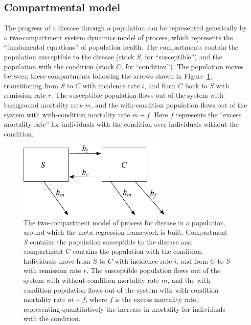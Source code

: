 \documentclass[12pt]{article}
\newcommand{\1}{\mathbf{1}}
\newcommand{\0}{\mathbf{0}}
\begin{document}
\subsection{Compartmental model}
The progress of a disease through a population can be represented
generically by a two-compartment system dynamics model of process,
which represents the ``fundamental equations'' of population
health. The compartments contain the population susceptible to the
disease (stock $S$, for ``susceptible'') and the population with the
condition (stock $C$, for ``condition''). The population moves between
these compartments following the arrows shown in
Figure~\ref{forward-sim-two-compartment}, transitioning from $S$ to
$C$ with incidence rate $i$, and from $C$ back to $S$ with remission
rate $r$. The susceptible population flows out of the system with
background mortality rate $m$, and the with-condition population flows
out of the system with with-condition mortality rate $m+f$.  Here $f$
represents the ``excess mortality rate'' for individuals with the
condition over individuals without the condition.

\begin{figure}[h]
\begin{center}
\includegraphics[width=3in]{SC.pdf}
\caption{The two-compartment model of process for disease in a
  population, around which the meta-regression framework is
  built. Compartment $S$ contains the population susceptible to the
  disease and compartment $C$ contains the population with the
  condition. Individuals move from $S$ to $C$ with incidence rate $i$,
  and from $C$ to $S$ with remission rate $r$. The susceptible
  population flows out of the system with without-condition mortality
  rate $m$, and the with-condition population flows out of the system
  with with-condition mortality rate $m+f$, where $f$ is the excess
  mortality rate, representing quantitatively the increase in
  mortality for individuals with the condition.}
\label{forward-sim-two-compartment}
\end{center}
\end{figure}
\end{document}

